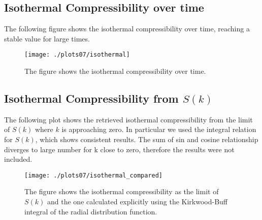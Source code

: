 \documentclass[aps,pra,reprint, onecolumn, rmp]{revtex4-2}
\begin{document}
\subsection{Isothermal Compressibility over time}
The following figure shows the isothermal compressibility over time, reaching a stable value for large times. 

\begin{figure}[h]
          \centering
          \texttt{[image: ./plots07/isothermal]}
          \caption{The figure shows the isothermal compressibility over time.}
\end{figure}

\subsection{Isothermal Compressibility from $S(k)$}
The following plot shows the retrieved isothermal compressibility from the limit of $S(k)$ where $k$ is approaching zero. In particular we used the integral relation for $S(k)$, which shows consistent results. The sum of sin and cosine relationship diverges to large number for k close to zero, therefore the results were not included.

\begin{figure}[h]
          \centering
          \texttt{[image: ./plots07/isothermal\_compared]}
          \caption{The figure shows the isothermal compressibility as the limit of $S(k)$ and the one calculated explicitly using the Kirkwood-Buff integral of the radial distribution function.}
\end{figure}
\end{document}
